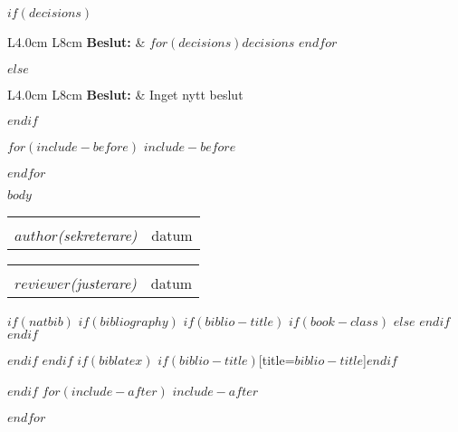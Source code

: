 \documentclass[$if(fontsize)$$fontsize$,$endif$$if(lang)$$babel-lang$,$endif$$if(papersize)$$papersize$,$endif$$for(classoption)$$classoption$$sep$,$endfor$]{$documentclass$}
\newcommand{\columnKeyWidth}{4.0cm}
\newcommand{\columnValueWidth}{8cm}
\newcommand{\placeEmptyLines}[1]{%
  \mbox{}%

  \vspace{#1\baselineskip}%
}
\newcommand{\SignatureAndDate}[2]{%
  \placeEmptyLines{4}
  \begin{tabular}{ll}%
    \makebox[7cm]{\hrulefill} & \makebox[2.5in]{\hrulefill}\\%
    #1\textit{(#2)}&datum\\%
  \end{tabular}%
  \newline
}
\begin{document}
\begin{titlepage}
%
%
$if(decisions)$
\begin{tabular}{ L{\columnKeyWidth} L{\columnValueWidth} }
  \textbf{\color{NavyBlue}Beslut:} & $for(decisions)$$decisions$ \newline $endfor$\\
\end{tabular}
$else$
\begin{tabular}{ L{\columnKeyWidth} L{\columnValueWidth} }
  \textbf{\color{NavyBlue}Beslut:} & Inget nytt beslut\\
\end{tabular}
$endif$


$for(include-before)$
$include-before$

$endfor$
\pagebreak

\end{titlepage}


%
%
$body$


%
%
\begin{minipage}{\textwidth}
\SignatureAndDate{$author$}{sekreterare}
\SignatureAndDate{$reviewer$}{justerare}
\end{minipage}

$if(natbib)$
$if(bibliography)$
$if(biblio-title)$
$if(book-class)$
\renewcommand\bibname{$biblio-title$}
$else$
\renewcommand\refname{$biblio-title$}
$endif$
$endif$


$endif$
$endif$
$if(biblatex)$
\printbibliography$if(biblio-title)$[title=$biblio-title$]$endif$

$endif$
$for(include-after)$
$include-after$

$endfor$
\end{document}
